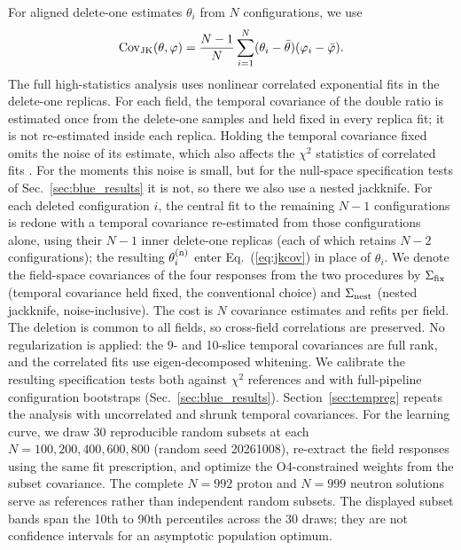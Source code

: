 \documentclass[aps,prd,preprint,nofootinbib,floatfix]{revtex4-2}
\begin{document}
For aligned delete-one estimates $\theta_i$ from $N$ configurations, we use
\begin{equation}
\mathrm{Cov}_{\rm JK}(\theta,\varphi)=\frac{N-1}{N}
\sum_{i=1}^N(\theta_i-\bar\theta)(\varphi_i-\bar\varphi).
\label{eq:jkcov}
\end{equation}
The full high-statistics analysis uses nonlinear correlated exponential fits in the delete-one replicas. For each field, the temporal covariance of the double ratio is estimated once from the delete-one samples and held fixed in every replica fit; it is not re-estimated inside each replica. Holding the temporal covariance fixed omits the noise of its estimate, which also affects the $\chi^2$ statistics of correlated fits \cite{BrunoSommer2023}. For the moments this noise is small, but for the null-space specification tests of Sec.~\ref{sec:blue_results} it is not, so there we also use a nested jackknife. For each deleted configuration $i$, the central fit to the remaining $N-1$ configurations is redone with a temporal covariance re-estimated from those configurations alone, using their $N-1$ inner delete-one replicas (each of which retains $N-2$ configurations); the resulting $\theta^{(\rm n)}_i$ enter Eq.~(\ref{eq:jkcov}) in place of $\theta_i$. We denote the field-space covariances of the four responses from the two procedures by $\Sigma_{\rm fix}$ (temporal covariance held fixed, the conventional choice) and $\Sigma_{\rm nest}$ (nested jackknife, noise-inclusive). The cost is $N$ covariance estimates and refits per field. The deletion is common to all fields, so cross-field correlations are preserved. No regularization is applied: the 9- and 10-slice temporal covariances are full rank, and the correlated fits use eigen-decomposed whitening. We calibrate the resulting specification tests both against $\chi^2$ references and with full-pipeline configuration bootstraps (Sec.~\ref{sec:blue_results}). Section~\ref{sec:tempreg} repeats the analysis with uncorrelated and shrunk temporal covariances. For the learning curve, we draw 30 reproducible random subsets at each $N=100,200,400,600,800$ (random seed 20261008), re-extract the field responses using the same fit prescription, and optimize the O4-constrained weights from the subset covariance. The complete $N=992$ proton and $N=999$ neutron solutions serve as references rather than independent random subsets. The displayed subset bands span the 10th to 90th percentiles across the 30 draws; they are not confidence intervals for an asymptotic population optimum.
\end{document}
